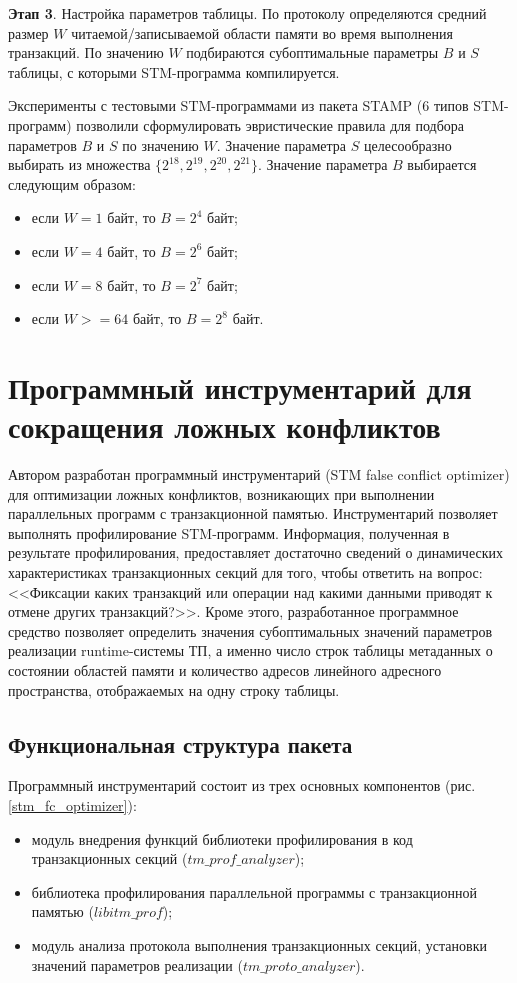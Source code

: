\textbf{Этап 3}. Настройка параметров таблицы. По протоколу определяются средний размер $W$ читаемой/записываемой области памяти во время выполнения транзакций. По значению $W$ подбираются субоптимальные параметры $B$ и $S$ таблицы, с которыми STM-программа компилируется. 

Эксперименты с тестовыми STM-программами из пакета STAMP (6 типов STM-программ) позволили сформулировать эвристические правила для подбора параметров $B$ и $S$ по значению $W$. Значение параметра $S$ целесообразно выбирать из множества $\{2^{18}, 2^{19}, 2^{20}, 2^{21}\}$. Значение параметра $B$ выбирается следующим образом:
\begin{itemize}
\item если $\textit{W} = 1$ байт, то $\textit{B} = 2^{4}$ байт;
\item если $\textit{W} = 4$ байт, то $\textit{B} = 2^{6}$ байт;
\item если $\textit{W} = 8$ байт, то $\textit{B} = 2^{7}$ байт;
\item если $\textit{W} >= 64$ байт, то $\textit{B} = 2^{8}$ байт.
\end{itemize}

\section{Программный инструментарий для сокращения ложных конфликтов}
Автором разработан программный инструментарий (STM false conflict optimizer) для оптимизации ложных конфликтов, возникающих при выполнении параллельных программ с транзакционной памятью. Инструментарий позволяет выполнять профилирование STM-программ. Информация, полученная в результате профилирования, предоставляет достаточно сведений о динамических характеристиках транзакционных секций для того, чтобы ответить на вопрос: <<Фиксации каких транзакций или операции над какими данными приводят к отмене других транзакций?>>. Кроме этого, разработанное программное средство позволяет определить значения субоптимальных значений параметров реализации runtime-системы ТП, а именно число строк таблицы метаданных о состоянии областей памяти и количество адресов линейного адресного пространства, отображаемых на одну строку таблицы.

\subsection{Функциональная структура пакета}
Программный инструментарий состоит из трех основных компонентов (рис. \ref{stm_fc_optimizer}):
\begin{itemize}
\item модуль внедрения функций библиотеки профилирования в код транзакционных секций ($tm\_prof\_analyzer$);
\item библиотека профилирования параллельной программы с транзакционной памятью ($libitm\_prof$);
\item модуль анализа протокола выполнения транзакционных секций, установки значений параметров реализации ($tm\_proto\_analyzer$).
\end{itemize}


